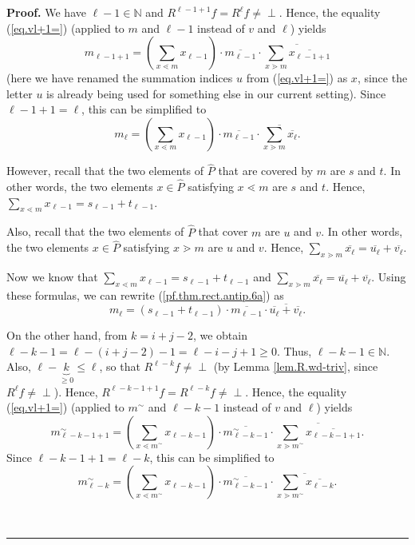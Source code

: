 \documentclass[numbers=enddot,12pt,final,onecolumn,notitlepage]{scrartcl}%
\theoremstyle{definition}
\newenvironment{verlong}{}{}
\newcommand{\undf}{\operatorname*{\bot}}
\newenvironment{proof}[1][Proof]{\noindent\textbf{#1.} }{\ \rule{0.5em}{0.5em}}
\let\sumnonlimits\sum
\renewcommand{\sum}{\sumnonlimits\limits}
\begin{document}
\begin{verlong}
\begin{proof}
We have $\ell-1\in\mathbb{N}$ and $R^{\ell-1+1}f=R^{\ell}f\neq\undf$. Hence,
the equality (\ref{eq.vl+1=}) (applied to $m$ and $\ell-1$ instead of $v$ and
$\ell$) yields%
\[
m_{\ell-1+1}=\left(  \sum_{x\lessdot m}x_{\ell-1}\right)  \cdot\overline
{m_{\ell-1}}\cdot\overline{\sum_{x\gtrdot m}\overline{x_{\ell-1+1}}}%
\]
(here we have renamed the summation indices $u$ from (\ref{eq.vl+1=}) as $x$,
since the letter $u$ is already being used for something else in our current
setting). Since $\ell-1+1=\ell$, this can be simplified to%
\begin{equation}
m_{\ell}=\left(  \sum_{x\lessdot m}x_{\ell-1}\right)  \cdot\overline
{m_{\ell-1}}\cdot\overline{\sum_{x\gtrdot m}\overline{x_{\ell}}}.
\label{pf.thm.rect.antip.6a}%
\end{equation}


However, recall that the two elements of $\widehat{P}$ that are covered by $m$
are $s$ and $t$. In other words, the two elements $x\in\widehat{P}$ satisfying
$x\lessdot m$ are $s$ and $t$. Hence, $\sum_{x\lessdot m}x_{\ell-1}=s_{\ell
-1}+t_{\ell-1}$.

Also, recall that the two elements of $\widehat{P}$ that cover $m$ are $u$ and
$v$. In other words, the two elements $x\in\widehat{P}$ satisfying $x\gtrdot
m$ are $u$ and $v$. Hence, $\sum_{x\gtrdot m}\overline{x_{\ell}}%
=\overline{u_{\ell}}+\overline{v_{\ell}}$.

Now we know that $\sum_{x\lessdot m}x_{\ell-1}=s_{\ell-1}+t_{\ell-1}$ and
$\sum_{x\gtrdot m}\overline{x_{\ell}}=\overline{u_{\ell}}+\overline{v_{\ell}}%
$. Using these formulas, we can rewrite (\ref{pf.thm.rect.antip.6a}) as%
\begin{equation}
m_{\ell}=\left(  s_{\ell-1}+t_{\ell-1}\right)  \cdot\overline{m_{\ell-1}}%
\cdot\overline{\overline{u_{\ell}}+\overline{v_{\ell}}}.
\label{pf.thm.rect.antip.6}%
\end{equation}


On the other hand, from $k=i+j-2$, we obtain $\ell-k-1=\ell-\left(
i+j-2\right)  -1=\ell-i-j+1\geq0$. Thus, $\ell-k-1\in\mathbb{N}$. Also,
$\ell-\underbrace{k}_{\geq0}\leq\ell$, so that $R^{\ell-k}f\neq\undf$ (by
Lemma \ref{lem.R.wd-triv}, since $R^{\ell}f\neq\undf$). Hence, $R^{\ell
-k-1+1}f=R^{\ell-k}f\neq\undf$. Hence, the equality (\ref{eq.vl+1=}) (applied
to $m^{\sim}$ and $\ell-k-1$ instead of $v$ and $\ell$) yields%
\[
m_{\ell-k-1+1}^{\sim}=\left(  \sum_{x\lessdot m^{\sim}}x_{\ell-k-1}\right)
\cdot\overline{m_{\ell-k-1}^{\sim}}\cdot\overline{\sum_{x\gtrdot m^{\sim}%
}\overline{x_{\ell-k-1+1}}}.
\]
Since $\ell-k-1+1=\ell-k$, this can be simplified to%
\begin{equation}
m_{\ell-k}^{\sim}=\left(  \sum_{x\lessdot m^{\sim}}x_{\ell-k-1}\right)
\cdot\overline{m_{\ell-k-1}^{\sim}}\cdot\overline{\sum_{x\gtrdot m^{\sim}%
}\overline{x_{\ell-k}}}. \label{pf.thm.rect.antip.7a}%
\end{equation}



\end{proof}
\end{verlong}
\end{document}
